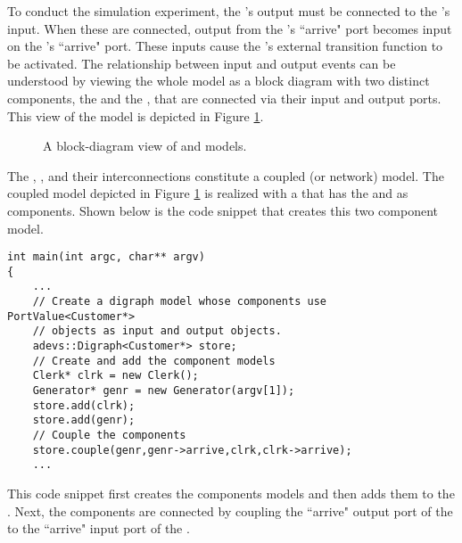 To conduct the simulation experiment, the 's output must be connected to the 's input.  When these are connected, output from the 's ``arrive" port becomes input on the 's ``arrive" port. These inputs cause the 's external transition function to be activated. The relationship between input and output events can be understood by viewing the whole model as a block diagram with two distinct components, the  and the , that are connected via their input and output ports. This view of the model is depicted in Figure \ref{fig:clerk_and_generator}.
\begin{figure}[ht]
\centering
{}
\caption{A block-diagram view of  and  models.}
\label{fig:clerk_and_generator}
\end{figure}

The , , and their interconnections constitute a coupled (or network) model. The coupled model depicted in Figure \ref{fig:clerk_and_generator} is realized with a  that has the  and  as components. Shown below is the code snippet that creates this two component model.
\begin{verbatim}
int main(int argc, char** argv)
{
    ...
    // Create a digraph model whose components use PortValue<Customer*>
    // objects as input and output objects.
    adevs::Digraph<Customer*> store;
    // Create and add the component models
    Clerk* clrk = new Clerk();
    Generator* genr = new Generator(argv[1]); 
    store.add(clrk);
    store.add(genr);
    // Couple the components
    store.couple(genr,genr->arrive,clrk,clrk->arrive);
    ...
\end{verbatim}
This code snippet first creates the components models and then adds them to the . Next, the components are connected by coupling the ``arrive" output port of the  to the ``arrive" input port of the .

